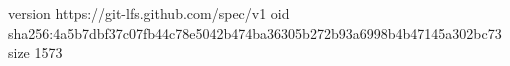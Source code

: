 version https://git-lfs.github.com/spec/v1
oid sha256:4a5b7dbf37c07fb44c78e5042b474ba36305b272b93a6998b4b47145a302bc73
size 1573

